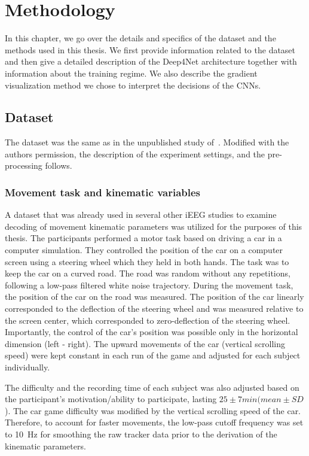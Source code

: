 \chapter{Methodology}\label{ch:methodology}
In this chapter, we go over the details and specifics of the dataset and the methods used in this thesis.
We first provide information related to the dataset and then give a detailed description of the Deep4Net architecture together with information about the training regime.
We also describe the gradient visualization method we chose to interpret the decisions of the CNNs.

\section{Dataset}\label{sec:dataset}
The dataset was the same as in the unpublished study of~\cite{Hammer-2021}.
Modified with the authors permission, the description of the experiment settings, and the pre-processing follows.

\subsection{Movement task and kinematic variables}\label{subsec:movement-task-and-kinematic-variables}
A dataset that was already used in several other iEEG studies to examine decoding of movement kinematic parameters\cite{Hammer-2021,hammer-predominance-2016,hammer-role-2013} was utilized for the purposes of this thesis.
The participants performed a motor task based on driving a car in a computer simulation.
They controlled the position of the car on a computer screen using a steering wheel which they held in both hands.
The task was to keep the car on a curved road.
The road was random without any repetitions, following a low-pass filtered white noise trajectory.
During the movement task, the position of the car on the road was measured.
The position of the car linearly corresponded to the deflection of the steering wheel and was measured relative to the screen center, which corresponded to zero-deflection of the steering wheel.
Importantly, the control of the car's position was possible only in the horizontal dimension (left - right).
The upward movements of the car (vertical scrolling speed) were kept constant in each run of the game and adjusted for each subject individually.

The difficulty and the recording time of each subject was also adjusted based on the participant's motivation/ability to participate, lasting $25 \pm 7 min (mean \pm SD$).
The car game difficulty was modified by the vertical scrolling speed of the car.
Therefore, to account for faster movements, the low-pass cutoff frequency was set to 10~Hz for smoothing the raw tracker data prior to the derivation of the kinematic parameters.

